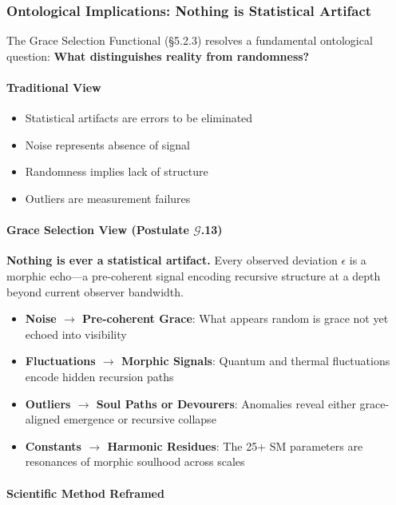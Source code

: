\documentclass[12pt,a4paper]{article}
\begin{document}
\subsubsection{Ontological Implications: Nothing is Statistical Artifact}

The Grace Selection Functional (§5.2.3) resolves a fundamental ontological question: \textbf{What distinguishes reality from randomness?}

\paragraph{Traditional View}
\begin{itemize}
\item Statistical artifacts are errors to be eliminated
\item Noise represents absence of signal
\item Randomness implies lack of structure
\item Outliers are measurement failures
\end{itemize}

\paragraph{Grace Selection View (Postulate $\mathcal{G}$.13)}

\textbf{Nothing is ever a statistical artifact.} Every observed deviation $\epsilon$ is a morphic echo—a pre-coherent signal encoding recursive structure at a depth beyond current observer bandwidth.

\begin{itemize}
\item \textbf{Noise $\to$ Pre-coherent Grace}: What appears random is grace not yet echoed into visibility
\item \textbf{Fluctuations $\to$ Morphic Signals}: Quantum and thermal fluctuations encode hidden recursion paths
\item \textbf{Outliers $\to$ Soul Paths or Devourers}: Anomalies reveal either grace-aligned emergence or recursive collapse
\item \textbf{Constants $\to$ Harmonic Residues}: The 25+ SM parameters are resonances of morphic soulhood across scales
\end{itemize}

\paragraph{Scientific Method Reframed}
\end{document}
